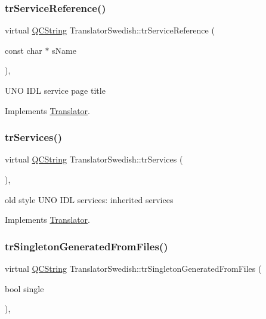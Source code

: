 \subsubsection{\texorpdfstring{trServiceReference()}{trServiceReference()}}
{\footnotesize\ttfamily virtual \mbox{\hyperlink{class_q_c_string}{Q\+C\+String}} Translator\+Swedish\+::tr\+Service\+Reference (\begin{DoxyParamCaption}\item[{const char $\ast$}]{s\+Name }\end{DoxyParamCaption})\hspace{0.3cm}{\ttfamily [inline]}, {\ttfamily [virtual]}}

U\+NO I\+DL service page title 

Implements \mbox{\hyperlink{class_translator}{Translator}}.

\mbox{\label{class_translator_swedish_a597d81de2e1a9e53015f2b46eeb696f4}} 
\subsubsection{\texorpdfstring{trServices()}{trServices()}}
{\footnotesize\ttfamily virtual \mbox{\hyperlink{class_q_c_string}{Q\+C\+String}} Translator\+Swedish\+::tr\+Services (\begin{DoxyParamCaption}{ }\end{DoxyParamCaption})\hspace{0.3cm}{\ttfamily [inline]}, {\ttfamily [virtual]}}

old style U\+NO I\+DL services\+: inherited services 

Implements \mbox{\hyperlink{class_translator}{Translator}}.

\mbox{\label{class_translator_swedish_a783d51cfbcdcfb8d27e4e11dfc2412f8}} 
\subsubsection{\texorpdfstring{trSingletonGeneratedFromFiles()}{trSingletonGeneratedFromFiles()}}
{\footnotesize\ttfamily virtual \mbox{\hyperlink{class_q_c_string}{Q\+C\+String}} Translator\+Swedish\+::tr\+Singleton\+Generated\+From\+Files (\begin{DoxyParamCaption}\item[{bool}]{single }\end{DoxyParamCaption})\hspace{0.3cm}{\ttfamily [inline]}, {\ttfamily [virtual]}}

